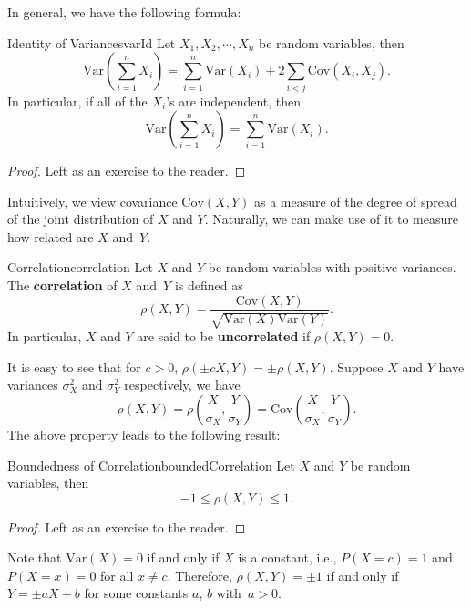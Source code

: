 \documentclass[math]{amznotes}
\theoremstyle{remark}
\newcommand{\0}{\mathbf{0}}
\newcommand{\1}{\mathbf{1}}
\begin{document}
In general, we have the following formula:
\begin{probox}{Identity of Variances}{varId}
    Let $X_1, X_2, \cdots, X_n$ be random variables, then
    \begin{equation*}
        \mathrm{Var}\left(\sum_{i = 1}^{n}X_i\right) = \sum_{i = 1}^{n}\mathrm{Var}(X_i) + 2\sum_{i < j}\mathrm{Cov}(X_i, X_j).
    \end{equation*}
    In particular, if all of the $X_i$'s are independent, then
    \begin{equation*}
        \mathrm{Var}\left(\sum_{i = 1}^{n}X_i\right) = \sum_{i = 1}^{n}\mathrm{Var}(X_i).
    \end{equation*}
    \tcblower
    \begin{proof}
        Left as an exercise to the reader.
    \end{proof}
\end{probox}
Intuitively, we view covariance $\mathrm{Cov}(X, Y)$ as a measure of the degree of spread of the joint distribution of $X$ and $Y$. Naturally, we can make use of it to measure how related are $X$ and~$Y$.
\begin{dfnbox}{Correlation}{correlation}
    Let $X$ and $Y$ be random variables with positive variances. The {\color{red} \textbf{correlation}} of $X$ and~$Y$ is defined as
    \begin{equation*}
        \rho(X, Y) = \frac{\mathrm{Cov}(X, Y)}{\sqrt{\mathrm{Var}(X)\mathrm{Var}(Y)}}.
    \end{equation*}
    In particular, $X$ and $Y$ are said to be {\color{red} \textbf{uncorrelated}} if $\rho(X, Y) = 0$.
\end{dfnbox}
It is easy to see that for $c > 0$, $\rho(\pm cX, Y) = \pm\rho(X, Y)$. Suppose $X$ and $Y$ have variances $\sigma_X^2$ and $\sigma_Y^2$ respectively, we have
\begin{equation*}
    \rho(X, Y) = \rho\left(\frac{X}{\sigma_X}, \frac{Y}{\sigma_Y}\right) = \mathrm{Cov}\left(\frac{X}{\sigma_X}, \frac{Y}{\sigma_Y}\right).
\end{equation*}
The above property leads to the following result:
\begin{probox}{Boundedness of Correlation}{boundedCorrelation}
    Let $X$ and $Y$ be random variables, then 
    \begin{equation*}
        -1 \leq \rho(X, Y) \leq 1.
    \end{equation*}
    \tcblower
    \begin{proof}
        Left as an exercise to the reader.
    \end{proof}
\end{probox}
Note that $\mathrm{Var}(X) = 0$ if and only if $X$ is a constant, i.e., $P(X = c) = 1$ and $P(X = x) = 0$ for all $x \neq c$. Therefore, $\rho(X, Y) = \pm 1$ if and only if $Y = \pm aX + b$ for some constants $a$, $b$ with~$a > 0$.
\end{document}
